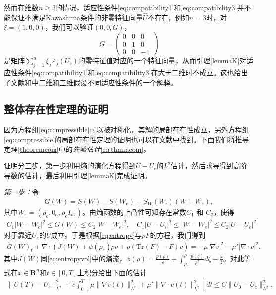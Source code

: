 \begin{remark}
然而在维数$n \ge 3$的情况，适应性条件\eqref{eq:compatibility1}和\eqref{eq:compatibility3}并不能保证不满足Kawashima条件的非零特征向量$\hat{U}$不存在，例如$n=3$时，对$\xi = (1,0,0)$，我们可以验证$(0,0, G)$，
 $$
 G = \left( \begin{array}{ccc}
 0 & 0 & 0 \\
 0 & 1 & 0 \\
 0 & 0 & -1 \end{array} \right)
 $$
是矩阵$ \sum_{j=1}^n \xi_j A_j(U_e)$的零特征值对应的一个特征向量，从而引理\ref{lemmaK}对适应性条件\eqref{eq:compatibility1}和\eqref{eq:compatibility3}在大于二维时不成立。这也给出了文献\cite{lin2005hydrodynamics}和\cite{liu2008global}中二维和三维假设不同适应性条件的一个解释。
\end{remark}

\subsection{整体存在性定理的证明}
因为方程组\eqref{eq:compressible}可以被对称化，其解的局部存在性成立\cite{kawashima1984systems}，另外方程组\eqref{eq:compressible}的局部存在性定理的证明也可以在文献\cite{lin2005hydrodynamics,lei2008global,hu2013global}中找到。下面我们将推导定理\ref{theoremcom}中的\emph{先验估计}\eqref{eq:thmincom}。

证明分三步，第一步利用熵的演化方程得到$U-U_e$的$L^2$估计，然后求导得到高阶导数的估计，最后利用引理\ref{lemmaK}完成证明。

\emph{第一步：}令
\begin{eqnarray*}
  G(W) = S(W) - S(W_e) - S_W(W_e) (W-W_e),
\end{eqnarray*}
其中$W_e = (\rho_e, 0_n, \rho_e I_{n^2})$。由熵函数的上凸性可知存在常数$C_1$ 和 $C_2$，使得
\begin{eqnarray*}
  C_1 |W-W_e|^2 \le G(W) \le C_2 |W-W_e|^2, \quad C_1 |U-U_e|^2 \le |W-W_e|^2 \le C_2 |U-U_e|^2
\end{eqnarray*}
对于靠近$U_e$的$U$成立。于是根据\eqref{eq:entropy}与$\rho F$的方程，我们得到
\begin{eqnarray*}
  G(W)_t + \nabla \cdot (J(W) + \phi(\rho_e) \rho  v  + \rho (\mbox{Tr}(F) - F) v ) = -\mu |\nabla  v |^2 - \mu' |\nabla \cdot  v |^2.
\end{eqnarray*}
其中$J(W)$同\eqref{eq:entropyvol}中的熵流，$\phi(\rho) = \frac{p(\rho)}{\rho} + \int_{\rho_0}^{\rho}\frac{p(\zeta)}{\zeta^2}d\zeta - \frac{n}{2}$。对此等式在$x\in\mathbf{R}^n$和$t\in[0, T]$上积分给出下面的估计
\begin{eqnarray}\label{eq:EnergyESTcom}
  \|U(T) - U_e\|_{L^2}^2 + c \int_0^T[ \mu \|\nabla v (t)\|_{L^2}^2 +  \mu' \|\nabla \cdot  v (t)\|_{L^2}^2] dt
  \le C\|U_0-U_e\|_{L^2}^2 .
\end{eqnarray}


